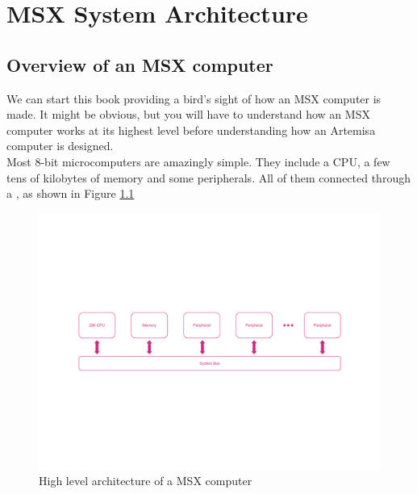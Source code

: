 \chapter{MSX System Architecture}

\section{Overview of an MSX computer}

We can start this book providing a bird’s sight of how an MSX computer is made. It might be obvious, but you will have to understand how an MSX computer works at its highest level before understanding how an Artemisa computer is designed.\\

Most 8-bit microcomputers are amazingly simple. They include a CPU, a few tens of kilobytes of memory and some peripherals. All of them connected through a , as shown in Figure \ref{fig:msx-arch-overview}

\begin{figure}
	\centering
	\includegraphics[width=\linewidth,trim={0cm 200 0 200}]{images/figures/msx-arch-overview}
	\caption{High level architecture of a MSX computer}
	\label{fig:msx-arch-overview}
\end{figure}


